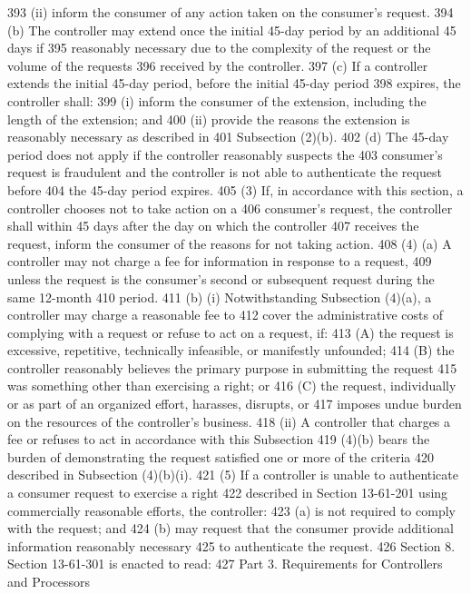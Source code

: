 393          (ii) inform the consumer of any action taken on the consumer's request.
394          (b) The controller may extend once the initial 45-day period by an additional 45 days if
395     reasonably necessary due to the complexity of the request or the volume of the requests
396     received by the controller.
397          (c) If a controller extends the initial 45-day period, before the initial 45-day period
398     expires, the controller shall:
399          (i) inform the consumer of the extension, including the length of the extension; and
400          (ii) provide the reasons the extension is reasonably necessary as described in
401     Subsection (2)(b).
402          (d) The 45-day period does not apply if the controller reasonably suspects the
403     consumer's request is fraudulent and the controller is not able to authenticate the request before
404     the 45-day period expires.
405          (3) If, in accordance with this section, a controller chooses not to take action on a
406     consumer's request, the controller shall within 45 days after the day on which the controller
407     receives the request, inform the consumer of the reasons for not taking action.
408          (4) (a) A controller may not charge a fee for information in response to a request,
409     unless the request is the consumer's second or subsequent request during the same 12-month
410     period.
411          (b) (i) Notwithstanding Subsection (4)(a), a controller may charge a reasonable fee to
412     cover the administrative costs of complying with a request or refuse to act on a request, if:
413          (A) the request is excessive, repetitive, technically infeasible, or manifestly unfounded;
414          (B) the controller reasonably believes the primary purpose in submitting the request
415     was something other than exercising a right; or
416          (C) the request, individually or as part of an organized effort, harasses, disrupts, or
417     imposes undue burden on the resources of the controller's business.
418          (ii) A controller that charges a fee or refuses to act in accordance with this Subsection
419     (4)(b) bears the burden of demonstrating the request satisfied one or more of the criteria
420     described in Subsection (4)(b)(i).
421          (5) If a controller is unable to authenticate a consumer request to exercise a right
422     described in Section 13-61-201 using commercially reasonable efforts, the controller:
423          (a) is not required to comply with the request; and
424          (b) may request that the consumer provide additional information reasonably necessary
425     to authenticate the request.
426          Section 8. Section 13-61-301 is enacted to read:
427     
Part 3. Requirements for Controllers and Processors

